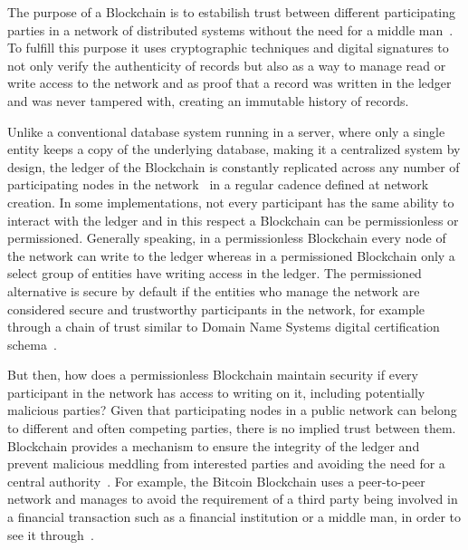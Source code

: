 The purpose of a Blockchain is to estabilish trust between different
participating parties in a network of distributed systems without the need for
a middle man~\cite{Drescher2017}. To fulfill this purpose it uses cryptographic
techniques and digital signatures to not only verify the authenticity of
records but also as a way to manage read or write access to the network and as
proof that a record was written in the ledger and was never tampered with,
creating an immutable history of records.

Unlike a conventional database system running in a server, where only a single
entity keeps a copy of the underlying database, making it a centralized system
by design, the ledger of the Blockchain is constantly replicated across any
number of participating nodes in the network~\cite{Lewis2015} in a regular
cadence defined at network creation. In some implementations, not every
participant has the same ability to interact with the ledger and in this
respect a Blockchain can be permissionless or permissioned.  Generally
speaking, in a permissionless Blockchain every node of the network can write to
the ledger whereas in a permissioned Blockchain only a select group of entities
have writing access in the ledger. The permissioned alternative is secure by
default if the entities who manage the network are considered secure and
trustworthy participants in the network, for example through a chain of trust
similar to Domain Name Systems digital certification
schema~\cite{Lewis2015,Valenta2017}.

But then, how does a permissionless Blockchain maintain security if every
participant in the network has access to writing on it, including potentially
malicious parties? Given that participating nodes in a public network can
belong to different and often competing parties, there is no implied trust
between them. Blockchain provides a mechanism to ensure the integrity of the
ledger and prevent malicious meddling from interested parties and avoiding the
need for a central authority~\cite{Barclay2017}. For example, the Bitcoin
Blockchain uses a peer-to-peer network and manages to avoid the requirement of
a third party being involved in a financial transaction such as a financial
institution or a middle man, in order to see it through~\cite{Nakamoto2008}.

